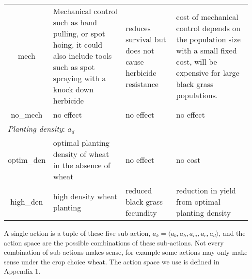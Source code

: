 \documentclass[12pt, a4paper]{article}
\begin{document}
\begin{longtable}[h]{c p{4.1cm} p{4.1cm} p{4.1cm}}
	mech & Mechanical control such as hand pulling, or spot hoing, it could also include tools such as spot spraying with a knock down herbicide & reduces survival but does not cause herbicide resistance & cost of mechanical control depends on the population size with a small fixed cost, will be expensive for large black grass populations.\\
	no\_mech & no effect & no effect & no effect\\
	\multicolumn{4}{l}{\textit{Planting density}: $a_d$}\\ 
	optim\_den & optimal planting density of wheat in the absence of wheat & no effect & no cost\\
	high\_den & high density wheat planting & reduced black grass fecundity & reduction in yield from optimal planting density\\ 
	\hline
\end{longtable}
A single action is a tuple of these five sub-action, $a_k = \langle a_b, a_h, a_m, a_c, a_d \rangle$, and the action space are the possible combinations of these sub-actions. Not every combination of sub actions makes sense, for example some actions may only make sense under the crop choice wheat. The action space we use is defined in Appendix 1.
\end{document}

